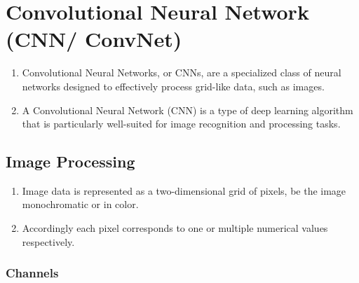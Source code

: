 \chapter{Convolutional Neural Network (CNN/ ConvNet) \cite{dnn-1,gfg-convolutional-neural-network-cnn-in-machine-learning}}\label{Convolutional Neural Network}

\begin{enumerate}
    \item Convolutional Neural Networks, or CNNs, are a specialized class of neural networks designed to effectively process grid-like data, such as images.

    \item A Convolutional Neural Network (CNN) is a type of deep learning algorithm that is particularly well-suited for image recognition and processing tasks.
\end{enumerate}




\section{Image Processing \cite{dnn-1}}

\begin{enumerate}
    \item Image data is represented as a two-dimensional grid of pixels, be the image monochromatic or in color.

    \item Accordingly each pixel corresponds to one or multiple numerical values respectively.

\end{enumerate}



\subsection{Channels \cite{dnn-1}}

